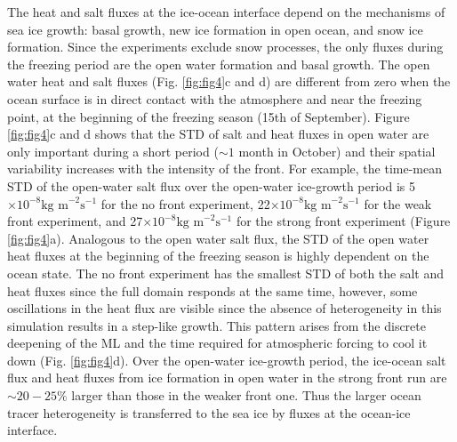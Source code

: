 \documentclass[draft]{agujournal2019}
\begin{document}
The heat and salt fluxes at the ice-ocean interface depend on the mechanisms of sea ice growth: basal growth, new ice formation in open ocean, and snow ice formation. Since the experiments exclude snow processes, the only fluxes during the freezing period are the open water formation and basal growth. The open water heat and salt fluxes (Fig. \ref{fig:fig4}c and d) are different from zero when the ocean surface is in direct contact with the atmosphere and near the freezing point, at the beginning of the freezing season (15th of September). Figure \ref{fig:fig4}c and d shows that the STD of salt and heat fluxes in open water are only important during a short period ($\sim1$ month in October) and their spatial variability increases with the intensity of the front. For example, the time-mean STD of the open-water salt flux over the open-water ice-growth period is 5$\times10^{-8} \text{kg\ m}^{-2}\text{s}^{-1}$ for the no front experiment, 22$\times10^{-8} \text{kg\ m}^{-2}\text{s}^{-1}$ for the weak front experiment, and 27$\times10^{-8} \text{kg\ m}^{-2}\text{s}^{-1}$ for the strong front experiment (Figure \ref{fig:fig4}a). Analogous to the open water salt flux, the STD of the open water heat fluxes at the beginning of the freezing season is highly dependent on the ocean state. The no front experiment has the smallest STD of both the salt and heat fluxes since the full domain responds at the same time, however, some oscillations in the heat flux are visible since the absence of heterogeneity in this simulation results in a step-like growth. This pattern arises from the discrete deepening of the ML and the time required for atmospheric forcing to cool it down (Fig. \ref{fig:fig4}d). Over the open-water ice-growth period, the ice-ocean salt flux and heat fluxes from ice formation in open water in the strong front run are $\sim 20-25\%$ larger than those in the weaker front one. Thus the larger ocean tracer heterogeneity is transferred to the sea ice by fluxes at the ocean-ice interface.
\end{document}
